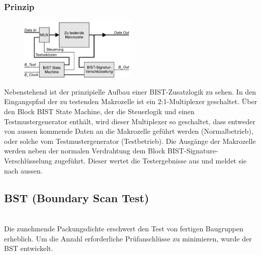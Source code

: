 \subsubsection{Prinzip}
\begin{multicols}{2}
\begin{figure}[H]
    \includegraphics[width=0.5\textwidth]{images/prinzip_bist.png}
\end{figure}
Nebenstehend ist der prinzipielle Aufbau einer BIST-Zusatzlogik zu sehen. In den Eingangspfad der zu testenden Makrozelle ist ein 2:1-Multiplexer geschaltet. Über den Block BIST State Machine, der die Steuerlogik und einen Testmustergenerator enthält, wird dieser Multiplexer so geschaltet, dass entweder von aussen kommende Daten an die Makrozelle geführt werden (Normalbetrieb), oder solche vom Testmustergenerator (Testbetrieb). Die Ausgänge der Makrozelle werden neben der normalen Verdrahtung dem Block BIST-Signature-Verschlüsselung zugeführt. Dieser wertet die Testergebnisse aus und meldet sie nach aussen.
\end{multicols}

\subsection{BST (Boundary Scan Test)}$~$ \\
Die zunehmende Packungsdichte erschwert den Test von fertigen Baugruppen erheblich. Um die Anzahl erforderliche Prüfanschlüsse zu minimieren, wurde der BST entwickelt.

